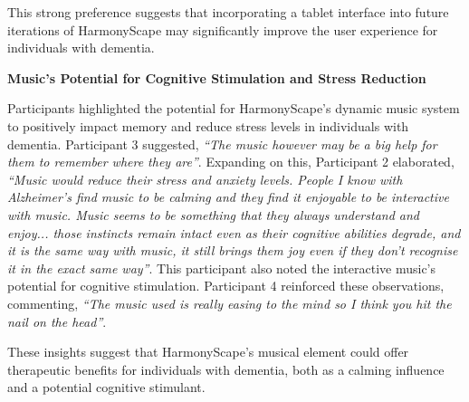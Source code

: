 \documentclass{l4proj}
\begin{document}
This strong preference suggests that incorporating a tablet interface into future iterations of HarmonyScape may significantly improve the user experience for individuals with dementia.
\newline

\textbf{Music's Potential for Cognitive Stimulation and Stress Reduction}

Participants highlighted the potential for HarmonyScape's dynamic music system to positively impact memory and reduce stress levels in individuals with dementia. Participant 3 suggested, \emph{“The music however may be a big help for them to remember where they are”}. Expanding on this, Participant 2 elaborated, \emph{“Music would reduce their stress and anxiety levels. People I know with Alzheimer's find music to be calming and they find it enjoyable to be interactive with music. Music seems to be something that they always understand and enjoy... those instincts remain intact even as their cognitive abilities degrade, and it is the same way with music, it still brings them joy even if they don't recognise it in the exact same way”}. This participant also noted the interactive music's potential for cognitive stimulation. Participant 4 reinforced these observations, commenting, \emph{“The music used is really easing to the mind so I think you hit the nail on the head”}. 

These insights suggest that HarmonyScape's musical element could offer therapeutic benefits for individuals with dementia, both as a calming influence and a potential cognitive stimulant.


\end{document}
